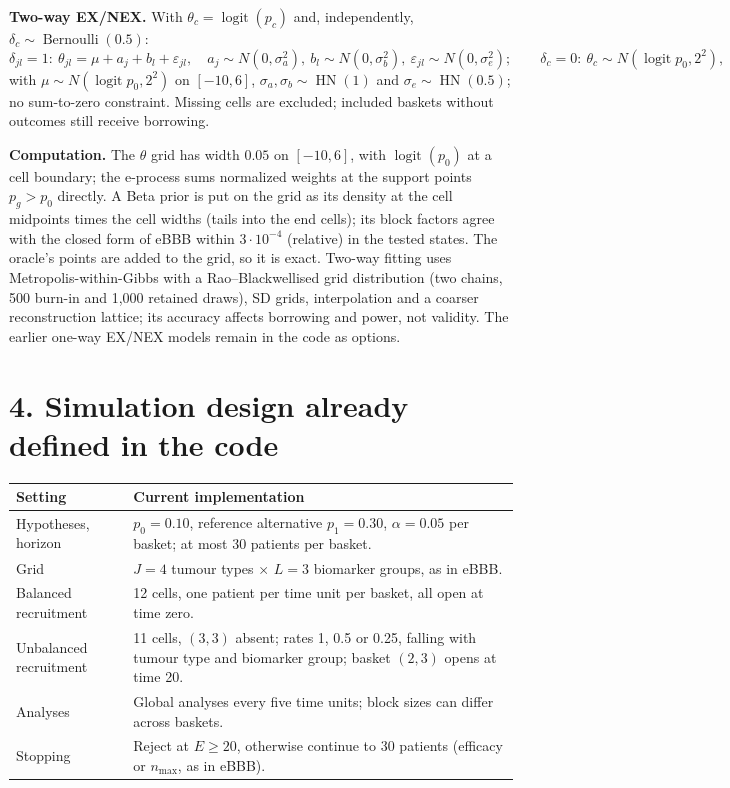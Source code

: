 \documentclass[10pt,a4paper]{article}
\newcommand{\logit}{\operatorname{logit}}
\newcommand{\HN}{\operatorname{HN}}
\begin{document}
\textbf{Two-way EX/NEX.} With $\theta_c=\logit(p_c)$ and, independently,
$\delta_c\sim\operatorname{Bernoulli}(0.5)$:
\[
 \delta_{jl}=1:\ \theta_{jl}=\mu+a_j+b_l+\varepsilon_{jl},\quad
 a_j\sim N(0,\sigma_a^2),\ b_l\sim N(0,\sigma_b^2),\ \varepsilon_{jl}\sim N(0,\sigma_e^2);
 \qquad \delta_c=0:\ \theta_c\sim N(\logit p_0,2^2),
\]
with $\mu\sim N(\logit p_0,2^2)$ on $[-10,6]$, $\sigma_a,\sigma_b\sim\HN(1)$ and
$\sigma_e\sim\HN(0.5)$; no sum-to-zero constraint. Missing cells are excluded;
included baskets without outcomes still receive borrowing.

\textbf{Computation.} The $\theta$ grid has width $0.05$ on $[-10,6]$, with
$\logit(p_0)$ at a cell boundary; the e-process sums normalized weights at the
support points $p_g>p_0$ directly. A Beta prior is put on the grid as its
density at the cell midpoints times the cell widths (tails into the end cells);
its block factors agree with the closed form of eBBB within $3\cdot10^{-4}$
(relative) in the tested states. The oracle's points are added to the grid, so it is exact. Two-way
fitting uses Metropolis-within-Gibbs with a Rao--Blackwellised grid
distribution (two chains, 500 burn-in and 1,000 retained draws), SD grids,
interpolation and a coarser reconstruction lattice; its accuracy affects
borrowing and power, not validity. The earlier one-way EX/NEX models remain in
the code as options.

\section*{4. Simulation design already defined in the code}
\begin{tabularx}{\linewidth}{@{}p{3.3cm}X@{}}
\toprule
Setting & Current implementation\\
\midrule
Hypotheses, horizon & $p_0=0.10$, reference alternative $p_1=0.30$, $\alpha=0.05$ per basket; at most 30 patients per basket.\\
Grid & $J=4$ tumour types $\times$ $L=3$ biomarker groups, as in eBBB.\\
Balanced recruitment & 12 cells, one patient per time unit per basket, all open at time zero.\\
Unbalanced recruitment & 11 cells, $(3,3)$ absent; rates 1, 0.5 or 0.25, falling with tumour type and biomarker group; basket $(2,3)$ opens at time 20.\\
Analyses & Global analyses every five time units; block sizes can differ across baskets.\\
Stopping & Reject at $E\ge20$, otherwise continue to 30 patients (efficacy or $n_{\max}$, as in eBBB).\\
\bottomrule
\end{tabularx}
\end{document}
